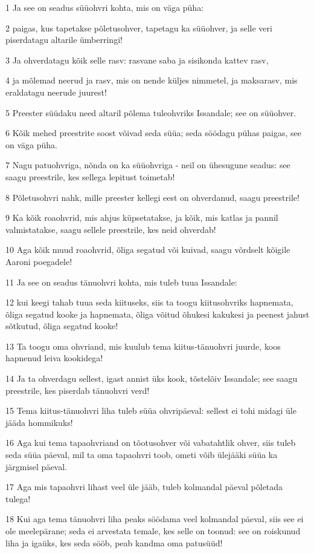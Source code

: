 \par 1 Ja see on seadus süüohvri kohta, mis on väga püha:
\par 2 paigas, kus tapetakse põletusohver, tapetagu ka süüohver, ja selle veri piserdatagu altarile ümberringi!
\par 3 Ja ohverdatagu kõik selle rasv: rasvane saba ja sisikonda kattev rasv,
\par 4 ja mõlemad neerud ja rasv, mis on nende küljes nimmetel, ja maksarasv, mis eraldatagu neerude juurest!
\par 5 Preester süüdaku need altaril põlema tuleohvriks Issandale; see on süüohver.
\par 6 Kõik mehed preestrite soost võivad seda süüa; seda söödagu pühas paigas, see on väga püha.
\par 7 Nagu patuohvriga, nõnda on ka süüohvriga - neil on ühesugune seadus: see saagu preestrile, kes sellega lepitust toimetab!
\par 8 Põletusohvri nahk, mille preester kellegi eest on ohverdanud, saagu preestrile!
\par 9 Ka kõik roaohvrid, mis ahjus küpsetatakse, ja kõik, mis katlas ja pannil valmistatakse, saagu sellele preestrile, kes neid ohverdab!
\par 10 Aga kõik muud roaohvrid, õliga segatud või kuivad, saagu võrdselt kõigile Aaroni poegadele!
\par 11 Ja see on seadus tänuohvri kohta, mis tuleb tuua Issandale:
\par 12 kui keegi tahab tuua seda kiituseks, siis ta toogu kiitusohvriks hapnemata, õliga segatud kooke ja hapnemata, õliga võitud õhukesi kakukesi ja peenest jahust sõtkutud, õliga segatud kooke!
\par 13 Ta toogu oma ohvriand, mis kuulub tema kiitus-tänuohvri juurde, koos hapnenud leiva kookidega!
\par 14 Ja ta ohverdagu sellest, igast annist üks kook, tõstelõiv Issandale; see saagu preestrile, kes piserdab tänuohvri verd!
\par 15 Tema kiitus-tänuohvri liha tuleb süüa ohvripäeval: sellest ei tohi midagi üle jääda hommikuks!
\par 16 Aga kui tema tapaohvriand on tõotusohver või vabatahtlik ohver, siis tuleb seda süüa päeval, mil ta oma tapaohvri toob, ometi võib ülejääki süüa ka järgmisel päeval.
\par 17 Aga mis tapaohvri lihast veel üle jääb, tuleb kolmandal päeval põletada tulega!
\par 18 Kui aga tema tänuohvri liha peaks söödama veel kolmandal päeval, siis see ei ole meelepärane; seda ei arvestata temale, kes selle on toonud: see on roiskunud liha ja igaüks, kes seda sööb, peab kandma oma patusüüd!
